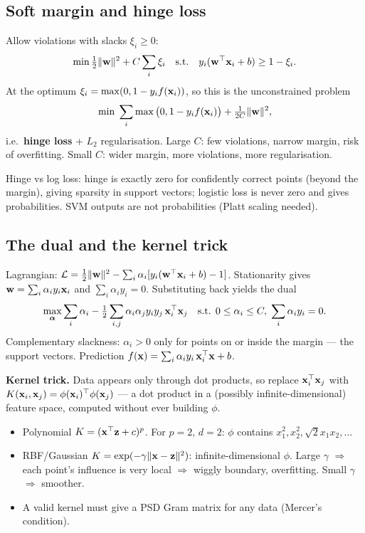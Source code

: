 \subsection{Soft margin and hinge loss}
Allow violations with slacks $\xi_i\ge0$:
\[\min\tfrac12\|\mathbf{w}\|^2+C\sum_i\xi_i\quad\text{s.t.}\quad y_i(\mathbf{w}^\top\mathbf{x}_i+b)\ge1-\xi_i.\]
At the optimum $\xi_i=\max(0,1-y_if(\mathbf{x}_i))$, so this is the unconstrained problem
\[\min\;\sum_i\max\big(0,1-y_if(\mathbf{x}_i)\big)+\tfrac{1}{2C}\|\mathbf{w}\|^2,\]
i.e.\ \textbf{hinge loss} + $L_2$ regularisation. Large $C$: few violations, narrow margin, risk of overfitting. Small $C$: wider margin, more violations, more regularisation.

Hinge vs log loss: hinge is exactly zero for confidently correct points (beyond the margin), giving sparsity in support vectors; logistic loss is never zero and gives probabilities. SVM outputs are not probabilities (Platt scaling needed).

\subsection{The dual and the kernel trick}
Lagrangian: $\mathcal{L}=\frac12\|\mathbf{w}\|^2-\sum_i\alpha_i[y_i(\mathbf{w}^\top\mathbf{x}_i+b)-1]$. Stationarity gives $\mathbf{w}=\sum_i\alpha_iy_i\mathbf{x}_i$ and $\sum_i\alpha_iy_i=0$. Substituting back yields the dual
\[\max_{\bm\alpha}\sum_i\alpha_i-\tfrac12\sum_{i,j}\alpha_i\alpha_jy_iy_j\,\mathbf{x}_i^\top\mathbf{x}_j\quad\text{s.t. }0\le\alpha_i\le C,\;\sum_i\alpha_iy_i=0.\]
Complementary slackness: $\alpha_i>0$ only for points on or inside the margin --- the support vectors. Prediction $f(\mathbf{x})=\sum_i\alpha_iy_i\,\mathbf{x}_i^\top\mathbf{x}+b$.

\textbf{Kernel trick.} Data appears only through dot products, so replace $\mathbf{x}_i^\top\mathbf{x}_j$ with $K(\mathbf{x}_i,\mathbf{x}_j)=\phi(\mathbf{x}_i)^\top\phi(\mathbf{x}_j)$ --- a dot product in a (possibly infinite-dimensional) feature space, computed without ever building $\phi$.
\begin{itemize}
  \item Polynomial $K=(\mathbf{x}^\top\mathbf{z}+c)^p$. For $p=2$, $d=2$: $\phi$ contains $x_1^2,x_2^2,\sqrt2x_1x_2,\dots$
  \item RBF/Gaussian $K=\exp(-\gamma\|\mathbf{x}-\mathbf{z}\|^2)$: infinite-dimensional $\phi$. Large $\gamma$ $\Rightarrow$ each point's influence is very local $\Rightarrow$ wiggly boundary, overfitting. Small $\gamma$ $\Rightarrow$ smoother.
  \item A valid kernel must give a PSD Gram matrix for any data (Mercer's condition).
\end{itemize}

